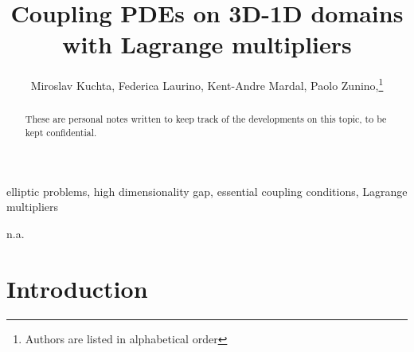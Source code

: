\documentclass[r]{siamart171218}
\title{Coupling PDEs on 3D-1D domains with Lagrange multipliers}
\author{Miroslav Kuchta, Federica Laurino, Kent-Andre Mardal, Paolo Zunino,\thanks{Authors are listed in alphabetical order}}
\begin{document}
\maketitle

\begin{abstract}
These are personal notes written to keep track of the developments on this topic, to be kept confidential.
\end{abstract}

\begin{keywords}
elliptic problems, high dimensionality gap, essential coupling conditions, Lagrange multipliers
\end{keywords}

\begin{AMS}
n.a.
\end{AMS}

 

\def\ud{u_{\odot}}
\def\vd{v_{\odot}}
\def\uf{u_{\ominus}}
\def\up{u_{\oplus}}
\def\eps{\epsilon}
\def\nn{\boldsymbol n}
\def\rr{\boldsymbol r}
\def\RR{\boldsymbol R}
\def\kk{\boldsymbol k}
\def\ss{\boldsymbol s}
\def\uu{\boldsymbol u}
\def\vv{\boldsymbol v}
\def\xx{\boldsymbol x}
\def\bu{\overline{u}}
\def\bv{\overline{v}}
\def\tu{\widetilde{u}}
\def\tv{\widetilde{v}}
\def\TT{\boldsymbol T}
\def\NN{\boldsymbol N}
\def\BB{\boldsymbol B}
\def\ttu{\widetilde{\widetilde{u}}}
\def\ttv{\widetilde{\widetilde{v}}}
\def\cv{\check{v}}
\def\mesh{{\cal T}^h}
\def\ball{{\cal B}}
\def\R{\mathbb{R}}
\def\D{\mathcal{D}}
\def\DD{\partial\mathcal{D}}
\def\trace{\overline{\mathcal{R}}}
\def\ext{\mathcal{E}}
\def\ide{\mathcal{I}}
\def\ii{\hat{\imath}}
\newcommand{\avrd}[1]{\overline{\overline{#1}}}
\newcommand{\avrc}[1]{\overline{#1}}
\newcommand{\refe}[1]{{#1}_{\mathrm{ref}}}

\newcommand{\vertiii}[1]{{\left\vert\kern-0.25ex\left\vert\kern-0.25ex\left\vert #1 
    \right\vert\kern-0.25ex\right\vert\kern-0.25ex\right\vert}}

\newtheorem{thm}{Theorem}[section]
\newtheorem{prop}{Property}[section]
\theoremstyle{remark}
\newtheorem{remark}{Remark}[section]
 
\section{Introduction}\label{sec:intro}
\end{document}

